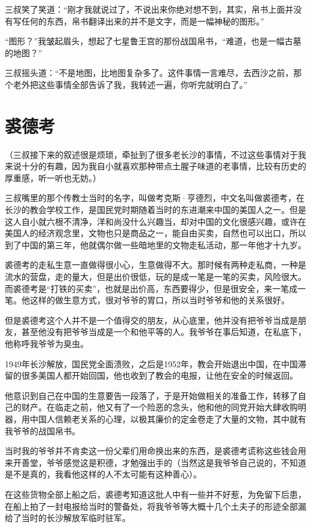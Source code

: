 三叔笑了笑道：“刚才我就说过了，不说出来你绝对想不到，其实，帛书上面并没有写任何的东西，帛书翻译出来的并不是文字，而是一幅神秘的图形。”

“图形？”我皱起眉头，想起了七星鲁王宫的那份战国帛书，“难道，也是一幅古墓的地图？”

三叔摇头道：“不是地图，比地图复杂多了。这件事情一言难尽，去西沙之前，那个老外把这些事情全部告诉了我，我转述一遍，你听完就明白了。”

\chapter{裘德考}

（三叔接下来的叙述很是烦琐，牵扯到了很多老长沙的事情，不过这些事情对于我来说十分的有趣，因为我自小就喜欢那种带点土腥子味道的老事情，比较有历史的厚重感，听一听也无妨。）

三叔嘴里的那个传教士当时的名字，叫做考克斯·亨德烈，中文名叫做裘德考，在长沙的教会学校工作，是国民党时期随着当时的东进潮来中国的美国人之一。但是这人自小就六根不清净，洋和尚没什么兴趣当，却对中国的文化很感兴趣，或许在美国人的经济观念里，文物也只是商品之一，能自由买卖，自然也可以出口，所以到了中国的第三年，他就偶尔做一些暗地里的文物走私活动，那一年他才十九岁。

裘德考的走私生意一直做得很小心，生意做得不大。那时候有两种走私商，一种是流水的营盘，走的量大，但是出价很低，玩的是成一笔是一笔的买卖，风险很大。而裘德考是“打铁的买卖”，也就是出价高，东西要得少，但是很安全，来一笔成一笔。他这样的做生意方式，很对爷爷的胃口，所以当时爷爷和他的关系很好。

但是裘德考这个人并不是一个值得交的朋友，从心底里，他并没有把爷爷当成是朋友，甚至他没有把爷爷当成是一个和他平等的人。我爷爷在事后知道，在私底下，他称呼我爷爷为臭虫。

1949年长沙解放，国民党全面溃败，之后是1952年，教会开始退出中国，在中国滞留的很多美国人都开始回国，他也收到了教会的电报，让他在安全的时候返回。

他意识到自己在中国的生意要告一段落了，于是开始做相关的准备工作，转移了自己的财产。在临走之前，他又有了一个险恶的念头，他和他的同党开始大肆收购明器，用中国人信赖老关系的心理，以极其廉价的定金卷走了大量的文物，其中就有我爷爷的战国帛书。

当时我的爷爷并不肯卖这一份父辈们用命换出来的东西，是裘德考谎称这些钱会用来开善堂，爷爷感觉这是积德，才勉强出手的（当然这是我爷爷自己说的，不知道是不是真的，我看他这样的人不太可能有这种善心）。

在这些货物全部上船之后，裘德考知道这批人中有一些并不好惹，为免留下后患，在船上拍了一封电报给当时的警备处，将我爷爷等大概十几个土夫子的形迹全部漏给了当时的长沙解放军临时驻军。

